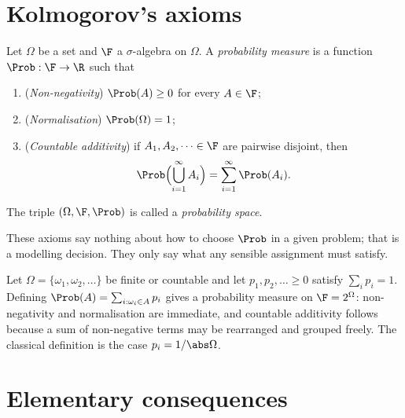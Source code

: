 \section{Kolmogorov's axioms}

\begin{definition}
Let $\Omega$ be a set and $\F$ a $\sigma$-algebra on $\Omega$. A
\emph{probability measure} is a function $\Prob:\F\to\R$ such that
\begin{enumerate}[label=\textbf{A\arabic*.}]
\item (\emph{Non-negativity}) $\Prob(A)\ge 0$ for every $A\in\F$;
\item (\emph{Normalisation}) $\Prob(\Omega)=1$;
\item (\emph{Countable additivity}) if $A_1,A_2,\dots\in\F$ are pairwise
disjoint, then
\[
\Prob\Bigl(\bigcup_{i=1}^\infty A_i\Bigr)=\sum_{i=1}^\infty\Prob(A_i).
\]
\end{enumerate}
The triple $(\Omega,\F,\Prob)$ is called a \emph{probability space}.
\end{definition}

These axioms say nothing about how to choose $\Prob$ in a given problem; that is
a modelling decision. They only say what any sensible assignment must satisfy.

\begin{example}\label{ex:discrete}
Let $\Omega=\{\omega_1,\omega_2,\dots\}$ be finite or countable and let
$p_1,p_2,\dots\ge 0$ satisfy $\sum_ip_i=1$. Defining
$\Prob(A)=\sum_{i:\omega_i\in A}p_i$ gives a probability measure on
$\F=2^\Omega$: non-negativity and normalisation are immediate, and countable
additivity follows because a sum of non-negative terms may be rearranged and
grouped freely. The classical definition is the case $p_i=1/\abs\Omega$.
\end{example}

\section{Elementary consequences}

